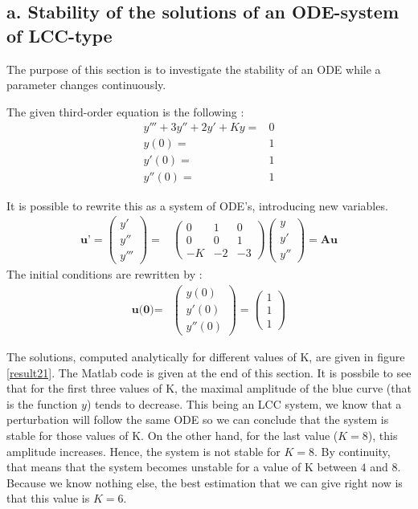 \subsection*{a. Stability of the solutions of an ODE-system of LCC-type}
The purpose of this section is to investigate the stability of an ODE while a parameter changes continuously.

The given third-order equation is the following : 
\begin{eqnarray*}
y'''+3y''+2y'+Ky =& 0 \\
y(0) =& 1\\
y'(0)=&1\\
y''(0)=&1
\end{eqnarray*}

It is possible to rewrite this as a system of ODE's, introducing new variables.
\begin{eqnarray*}
\textbf{u'}  = \left( \begin{array}{c}
y' \\ 
y'' \\ 
y'''
\end{array} \right) =& \left( \begin{array}{ccc}
0 & 1 & 0 \\ 
0 & 0 & 1 \\ 
-K & -2 & -3
\end{array}  \right) \left( \begin{array}{c}
y \\ 
y'\\ 
y''
\end{array} \right) = \textbf{Au} 
\end{eqnarray*}
The initial conditions are rewritten by :
\begin{eqnarray*}
\textbf{u(0)} =& \left( \begin{array}{c}
y(0) \\ 
y'(0)\\ 
y''(0)
\end{array} \right) = \left( \begin{array}{c}
1\\ 
1\\ 
1
\end{array} \right) 
\end{eqnarray*}

The solutions, computed analytically for different values of K, are given in figure \ref{result21}. The Matlab code is given at the end of this section. It is possbile to see that for the first three values of K, the maximal amplitude of the blue curve (that is the function $y$) tends to decrease. This being an LCC system, we know that a perturbation will follow the same ODE so we can conclude that the system is stable for those values of K. On the other hand, for the last value ($K=8$), this amplitude increases. Hence, the system is not stable for $K=8$. By continuity, that means that the system becomes unstable for a value of K between $4$ and $8$. Because we know nothing else, the best estimation that we can give right now is that this value is $K=6$.\\

